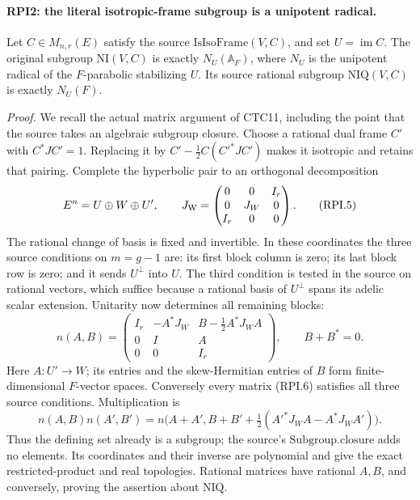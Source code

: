 \paragraph{RPI2: the literal isotropic-frame subgroup is a unipotent radical.}
\label{claim:RPI2}
Let \(C\in M_{n,r}(E)\) satisfy the source
\(\mathrm{IsIsoFrame}(V,C)\), and set \(U=\operatorname{im}C\).
The original subgroup \(\mathrm{NI}(V,C)\) is exactly
\(N_U(\mathbb A_F)\), where \(N_U\) is the unipotent radical of the
\(F\)-parabolic stabilizing \(U\).  Its source rational subgroup
\(\mathrm{NIQ}(V,C)\) is exactly \(N_U(F)\).

\emph{Proof.}
We recall the actual matrix argument of CTC11, including the point
that the source takes an algebraic subgroup closure.  Choose a
rational dual frame \(C'\) with \(C^*JC'=1\).  Replacing it by
\(C'-\frac12C(C'^*JC')\) makes it isotropic and retains that pairing.
Complete the hyperbolic pair to an orthogonal decomposition
\[
 E^n=U\oplus W\oplus U',\qquad
 J_{\rm W}=\begin{pmatrix}0&0&I_r\\0&J_W&0\\I_r&0&0\end{pmatrix}.
 \tag{RPI.5}
\]
The rational change of basis is fixed and invertible.
In these coordinates the three source conditions on \(m=g-1\) are:
its first block column is zero; its last block row is zero; and
it sends \(U^\perp\) into \(U\).  The third condition is tested in
the source on rational vectors, which suffice because a rational
basis of \(U^\perp\) spans its adelic scalar extension.
Unitarity now determines all remaining blocks:
\[
 n(A,B)=
 \begin{pmatrix}
 I_r&-A^*J_W&B-\frac12A^*J_WA\\
 0&I&A\\
 0&0&I_r
 \end{pmatrix},
       \qquad B+B^*=0.
 \tag{RPI.6}
\]
Here \(A:U'\to W\); its entries and the skew-Hermitian entries of
\(B\) form finite-dimensional \(F\)-vector spaces.  Conversely every
matrix (RPI.6) satisfies all three source conditions.
Multiplication is
\[
 n(A,B)n(A',B')=
 n\bigl(A+A',B+B'+\tfrac12(A'^*J_WA-A^*J_WA')\bigr).
 \tag{RPI.7}
\]
Thus the defining set already is a subgroup; the source's
\(\mathrm{Subgroup.closure}\) adds no elements.  Its coordinates
and their inverse are polynomial and give the exact restricted-product
and real topologies.  Rational matrices have rational \(A,B\), and
conversely, proving the assertion about \(\mathrm{NIQ}\).

